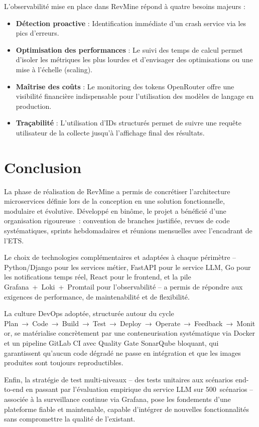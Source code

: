 L'observabilité mise en place dans RevMine répond à quatre besoins majeurs :

\begin{itemize}
    \item \textbf{Détection proactive} : Identification immédiate d'un crash service via les pics d'erreurs.
    \item \textbf{Optimisation des performances} : Le suivi des temps de calcul permet d'isoler les métriques les plus lourdes et d'envisager des optimisations ou une mise à l'échelle (scaling).
    \item \textbf{Maîtrise des coûts} : Le monitoring des tokens OpenRouter offre une visibilité financière indispensable pour l'utilisation des modèles de langage en production.
    \item \textbf{Traçabilité} : L'utilisation d'IDs structurés permet de suivre une requête utilisateur de la collecte jusqu'à l'affichage final des résultats.
\end{itemize}
\section{Conclusion}

La phase de réalisation de RevMine a permis de concrétiser l'architecture microservices définie
lors de la conception en une solution fonctionnelle, modulaire et évolutive. Développé en binôme,
le projet a bénéficié d'une organisation rigoureuse~: convention de branches justifiée, revues de
code systématiques, sprints hebdomadaires et réunions mensuelles avec l'encadrant de l'ETS.

Le choix de technologies complémentaires et adaptées à chaque périmètre -- Python/Django pour les
services métier, FastAPI pour le service LLM, Go pour les notifications temps réel, React pour le
frontend, et la pile Grafana~+~Loki~+~Promtail pour l'observabilité -- a permis de répondre aux
exigences de performance, de maintenabilité et de flexibilité.

La culture DevOps adoptée, structurée autour du cycle Plan~→~Code~→~Build~→~Test~→~Deploy~→~Operate~→~Feedback~→~Monitor, se matérialise concrètement par une conteneurisation systématique via Docker et un pipeline GitLab CI avec Quality Gate SonarQube bloquant, qui garantissent qu'aucun code dégradé ne passe en intégration et que les images produites sont toujours reproductibles.

Enfin, la stratégie de test multi-niveaux -- des tests unitaires aux scénarios end-to-end en
passant par l'évaluation empirique du service LLM sur 500~scénarios -- associée à la surveillance
continue via Grafana, pose les fondements d'une plateforme fiable et maintenable, capable
d'intégrer de nouvelles fonctionnalités sans compromettre la qualité de l'existant.